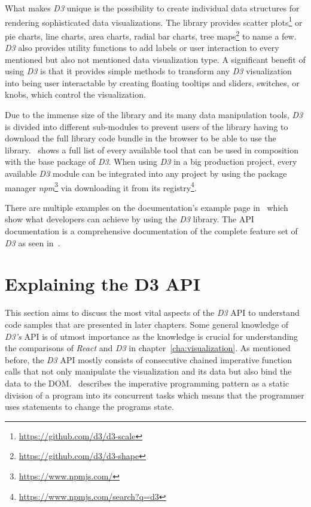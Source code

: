 What makes \emph{D3} unique is the possibility to create individual data structures for rendering sophisticated data visualizations. The library provides scatter plots\footnote{\url{https://github.com/d3/d3-scale}} or pie charts, line charts, area charts, radial bar charts, tree maps\footnote{\url{https://github.com/d3/d3-shape}} to name a few. \emph{D3} also provides utility functions to add labels or user interaction to every mentioned but also not mentioned data visualization type. A sig\-nifi\-cant benefit of using \emph{D3} is that it provides simple methods to transform any \emph{D3} visualization into being user interactable by creating floating tooltips and sliders, switches, or knobs, which control the visualization.

Due to the immense size of the library and its many data manipulation tools, \emph{D3} is divided into different sub-modules to prevent users of the library having to download the full library code bundle in the browser to be able to use the library.~\cite{D3Github} shows a full list of every available tool that can be used in composition with the base package of \emph{D3}. When using \emph{D3} in a big production project, every available \emph{D3} module can be integrated into any project by using the package manager \emph{npm}\footnote{\url{https://www.npmjs.com/}} via downloading it from its registry\footnote{\url{https://www.npmjs.com/search?q=d3}}.

\begin{emergency}{1em}
There are multiple examples on the documentation's example page in~\cite{D3Examples} which show what developers can achieve by using the \emph{D3} library. The API documentation is a comprehensive documentation of the complete feature set of \emph{D3} as seen in~\cite{D3Github}. %
\end{emergency}


\section{Explaining the D3 API} 

This section aims to discuss the most vital aspects of the \emph{D3} API to understand code samples that are presented in later chapters. Some general knowledge of \emph{D3's} API is of utmost importance as the knowledge is crucial for understanding the comparisons of \emph{React} and \emph{D3} in chapter~\ref{cha:visualization}. As mentioned before, the \emph{D3} API mostly consists of consecutive chained imperative function calls that not only manipulate the visualization and its data but also bind the data to the DOM.~\cite[p.\ 625]{prgLngDesignImpl} describes the imperative programming pattern as a static division of a program into its concurrent tasks which means that the programmer uses statements to change the programs state. 

